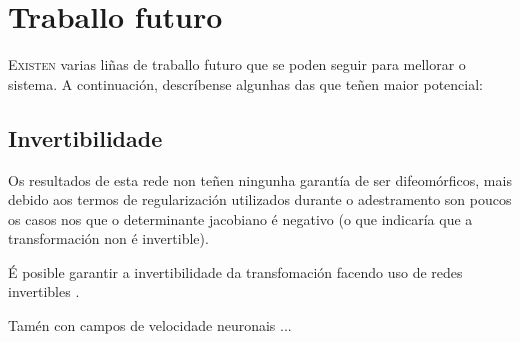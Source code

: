 \chapter{Traballo futuro}
\label{chap:Traballo futuro}

\lettrine{E}{xisten} varias liñas de traballo futuro que se poden seguir para mellorar o sistema.
A continuación, descríbense algunhas das que teñen maior potencial:







\section{Invertibilidade}
\label{sec:Invertibilidade}

Os resultados de esta rede non teñen ningunha garantía de ser difeomórficos, 
mais debido aos termos de regularización utilizados durante o adestramento son poucos os casos nos que o determinante jacobiano é negativo (o que indicaría que a transformación non é invertible).

É posible garantir a invertibilidade da transfomación facendo uso de redes invertibles \cite{jacobsen2018irevnetdeepinvertiblenetworks}.

Tamén con campos de velocidade neuronais \cite{sun2024medicalimageregistrationneural} ...